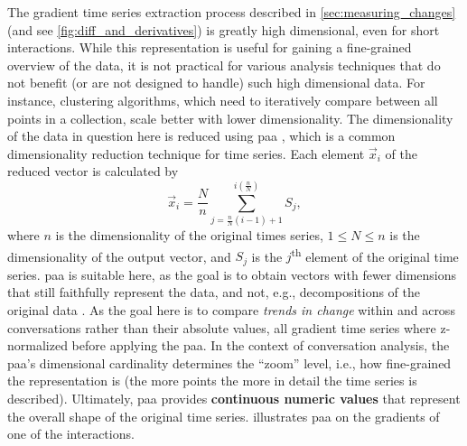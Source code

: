 The gradient time series extraction process described in \cref{sec:measuring_changes} (and see \cref{fig:diff_and_derivatives}) is greatly high dimensional, even for short interactions.
While this representation is useful for gaining a fine-grained overview of the data, it is not practical for various analysis techniques that do not benefit (or are not designed to handle) such high dimensional data.
For instance, clustering algorithms, which need to iteratively compare between all points in a collection, scale better with lower dimensionality.
The dimensionality of the data in question here is reduced using \acf{paa} \citep{Keogh2001dimensionality}, which is a common dimensionality reduction technique for time series.
Each element $\vec{x}_i$ of the reduced vector is calculated by
%
\begin{equation}
	\label{eq:paa}
	\vec{x}_i = \frac{N}{n} \sum_{j=\frac{n}{N}(i-1)+1}^{i(\frac{n}{N})} S_j,
\end{equation}
\noindent
%
where $n$ is the dimensionality of the original times series, $1 \leq N \leq n$ is the dimensionality of the output vector, and $S_j$ is the $j$\textsuperscript{th} element of the original time series.
\Ac{paa} is suitable here, as the goal is to obtain vectors with fewer dimensions that still faithfully represent the data, and not, e.g., decompositions of the original data \citep[cf.\ method survey in][pp.\ 271-275]{Keogh2001dimensionality}.
As the goal here is to compare \emph{trends in change} within and across conversations rather than their absolute values, all gradient time series where z-normalized before applying the \ac{paa}.
In the context of conversation analysis, the \ac{paa}'s dimensional cardinality determines the \enquote{zoom} level, i.e., how fine-grained the representation is (the more points the more in detail the time series is described).
Ultimately, \ac{paa} provides \textbf{continuous numeric values} that represent the overall shape of the original time series.
 illustrates \ac{paa} on the gradients of one of the interactions.

